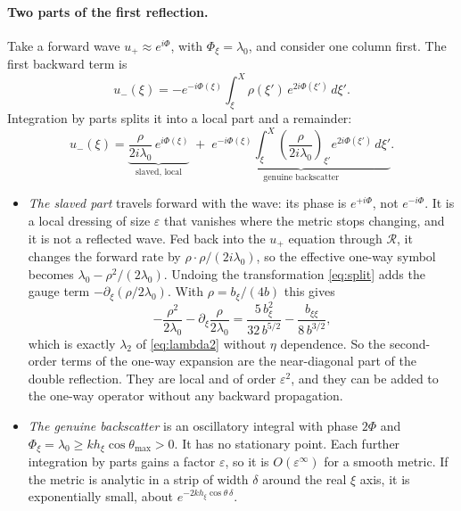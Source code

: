 \documentclass[11pt]{article}
\newcommand{\pd}{\partial}
\begin{document}
\paragraph{Two parts of the first reflection.} Take a forward wave
$u_+\approx e^{i\Phi}$, with $\Phi_\xi=\lambda_0$, and consider one column
first. The first backward term is
\begin{equation}\label{eq:back}
u_-(\xi)=-e^{-i\Phi(\xi)}\int_\xi^X\rho(\xi')\,e^{2i\Phi(\xi')}\,d\xi' .
\end{equation}
Integration by parts splits it into a local part and a remainder:
\[
u_-(\xi)=\underbrace{\frac{\rho}{2i\lambda_0}\,e^{i\Phi(\xi)}}_{\text{slaved, local}}
\;+\;\underbrace{e^{-i\Phi(\xi)}\int_\xi^X\left(\frac{\rho}{2i\lambda_0}\right)_{\xi'}e^{2i\Phi(\xi')}\,d\xi'}_{\text{genuine backscatter}} .
\]
\begin{itemize}
\item \emph{The slaved part} travels forward with the wave: its phase is
  $e^{+i\Phi}$, not $e^{-i\Phi}$. It is a local dressing of size
  $\varepsilon$ that vanishes where the metric stops changing, and it is not a
  reflected wave. Fed back into the $u_+$ equation through $\mathcal R$, it
  changes the forward rate by $\rho\cdot\rho/(2i\lambda_0)$, so the effective
  one-way symbol becomes $\lambda_0-\rho^2/(2\lambda_0)$. Undoing the
  transformation \eqref{eq:split} adds the gauge term $-\pd_\xi(\rho/2\lambda_0)$.
  With $\rho=b_\xi/(4b)$ this gives
  \[
  -\frac{\rho^2}{2\lambda_0}-\pd_\xi\frac{\rho}{2\lambda_0}
  =\frac{5\,b_\xi^2}{32\,b^{5/2}}-\frac{b_{\xi\xi}}{8\,b^{3/2}},
  \]
  which is exactly $\lambda_2$ of \eqref{eq:lambda2} without $\eta$ dependence.
  So the second-order terms of the one-way expansion are the near-diagonal
  part of the double reflection. They are local and of order $\varepsilon^2$,
  and they can be added to the one-way operator without any backward
  propagation.
\item \emph{The genuine backscatter} is an oscillatory integral with phase
  $2\Phi$ and $\Phi_\xi=\lambda_0\ge kh_\xi\cos\theta_{\max}>0$. It has no
  stationary point. Each further integration by parts gains a factor
  $\varepsilon$, so it is $O(\varepsilon^\infty)$ for a smooth metric. If the
  metric is analytic in a strip of width $\delta$ around the real $\xi$ axis,
  it is exponentially small, about $e^{-2kh_\xi\cos\theta\,\delta}$.
\end{itemize}
\end{document}
